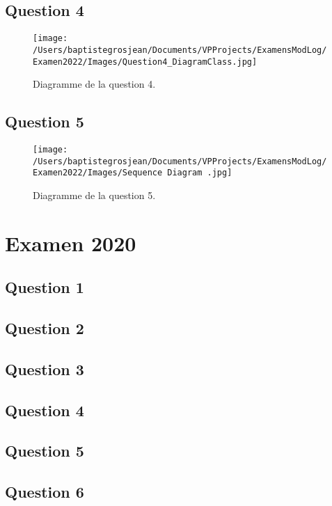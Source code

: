 \subsection*{Question 4}
\begin{figure}[H]
	\centering
	\texttt{[image: /Users/baptistegrosjean/Documents/VPProjects/ExamensModLog/Examen2022/Images/Question4\_DiagramClass.jpg]}
	\caption{Diagramme de la question 4.}
\end{figure}
\subsection*{Question 5}
\begin{figure}[H]
	\centering
	\texttt{[image: /Users/baptistegrosjean/Documents/VPProjects/ExamensModLog/Examen2022/Images/Sequence Diagram .jpg]}
	\caption{Diagramme de la question 5.}
\end{figure}

\newpage
\section{Examen 2020}
\subsection*{Question 1}
\subsection*{Question 2}
\subsection*{Question 3}
\subsection*{Question 4}
\subsection*{Question 5}
\subsection*{Question 6}
